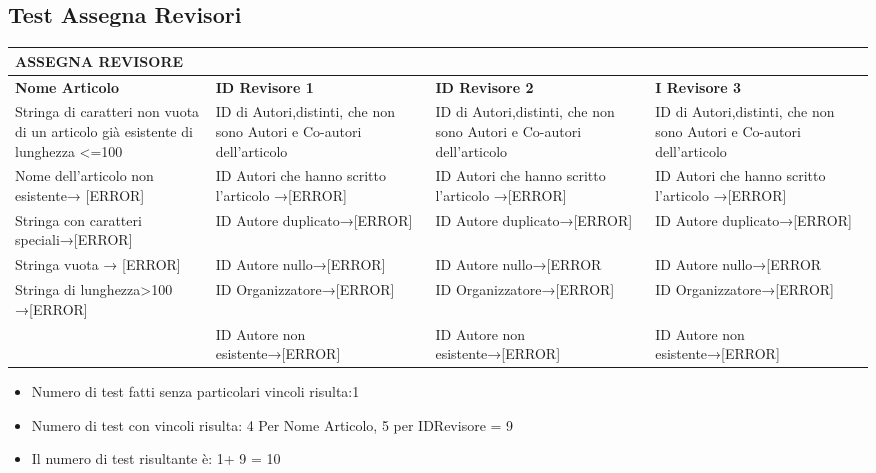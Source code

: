 \subsection{Test Assegna Revisori}
\label{sec:test_assegna_revisori}

\begin{tabular}{|p{3.5cm}|p{3cm}|p{3cm}|p{3cm}|}
\hline
\rowcolor{SkyBlue}
\textbf{ASSEGNA REVISORE} & & &\\
\hline
\rowcolor{Red}
\textbf{Nome Articolo} & \textbf{ID Revisore 1} & \textbf{ID Revisore 2} & \textbf{I Revisore 3}  \\
\hline
Stringa di caratteri non vuota di un articolo già esistente di lunghezza <=100 & ID di Autori,distinti, che non sono Autori e Co-autori dell'articolo & ID di Autori,distinti, che non sono Autori e Co-autori dell'articolo & ID di Autori,distinti, che non sono Autori e Co-autori dell'articolo \\
\hline
Nome dell'articolo non esistente→ [ERROR]& ID Autori che hanno scritto l'articolo →[ERROR] & ID Autori che hanno scritto l'articolo →[ERROR] & ID Autori che hanno scritto l'articolo →[ERROR]\\
\hline
Stringa con caratteri speciali→[ERROR]&   ID Autore duplicato→[ERROR] & ID Autore duplicato→[ERROR] & ID Autore duplicato→[ERROR] \\
\hline
Stringa vuota → [ERROR]&ID Autore nullo→[ERROR]& ID Autore nullo→[ERROR & ID Autore nullo→[ERROR \\
\hline
Stringa di lunghezza>100 →[ERROR]&  ID Organizzatore→[ERROR] &  ID Organizzatore→[ERROR] &  ID Organizzatore→[ERROR] \\
\hline
& ID Autore non esistente→[ERROR] & ID Autore non esistente→[ERROR] & ID Autore non esistente→[ERROR] \\
\hline
\hline
\end{tabular}

\begin{itemize}
\item Numero di test fatti senza particolari vincoli risulta:1
\item Numero di test con vincoli risulta: 4 Per Nome Articolo, 5 per IDRevisore = 9 
\item  Il numero di test risultante è: 1+ 9 = 10
\end{itemize}
 
